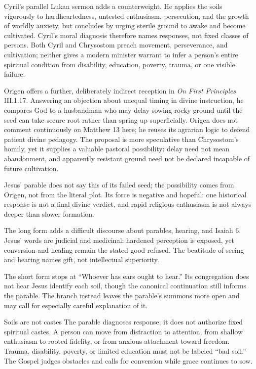Cyril's parallel Lukan sermon adds a counterweight. He applies the soils vigorously to hardheartedness, untested enthusiasm, persecution, and the growth of worldly anxiety, but concludes by urging sterile ground to awake and become cultivated. Cyril's moral diagnosis therefore names responses, not fixed classes of persons. Both Cyril and Chrysostom preach movement, perseverance, and cultivation; neither gives a modern minister warrant to infer a person's entire spiritual condition from disability, education, poverty, trauma, or one visible failure.

Origen offers a further, deliberately indirect reception in \emph{On First Principles} III.1.17. Answering an objection about unequal timing in divine instruction, he compares God to a husbandman who may delay sowing rocky ground until the seed can take secure root rather than spring up superficially. Origen does not comment continuously on Matthew 13 here; he reuses its agrarian logic to defend patient divine pedagogy. The proposal is more speculative than Chrysostom's homily, yet it supplies a valuable pastoral possibility: delay need not mean abandonment, and apparently resistant ground need not be declared incapable of future cultivation.

Jesus' parable does not say this of its failed seed; the possibility comes from Origen, not from the literal plot. Its force is negative and hopeful: one historical response is not a final divine verdict, and rapid religious enthusiasm is not always deeper than slower formation.

The long form adds a difficult discourse about parables, hearing, and Isaiah 6. Jesus' words are judicial and medicinal: hardened perception is exposed, yet conversion and healing remain the stated good refused. The beatitude of seeing and hearing names gift, not intellectual superiority.

The short form stops at “Whoever has ears ought to hear.” Its congregation does not hear Jesus identify each soil, though the canonical continuation still informs the parable. The branch instead leaves the parable's summons more open and may call for especially careful explanation of it.

\begin{studybox}{Soils are not castes}
The parable diagnoses response; it does not authorize fixed spiritual castes. A person can move from distraction to attention, from shallow enthusiasm to rooted fidelity, or from anxious attachment toward freedom. Trauma, disability, poverty, or limited education must not be labeled “bad soil.” The Gospel judges obstacles and calls for conversion while grace continues to sow.
\end{studybox}

